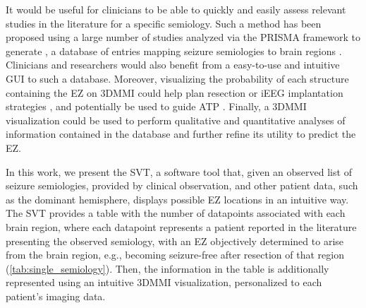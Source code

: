 It would be useful for clinicians to be able to quickly and easily assess relevant studies in the literature for a specific semiology.
Such a method has been proposed using a large number of studies analyzed via the \ac{PRISMA} framework \cite{page_prisma_2021} to generate \svtdatabase, a database of entries mapping seizure semiologies to brain regions \cite{alim-marvasti_probabilistic_2022}.
Clinicians and researchers would also benefit from a easy-to-use and intuitive \ac{GUI} to such a database.
Moreover, visualizing the probability of each structure containing the \ac{EZ} on \ac{3DMMI} could help plan resection or \ac{iEEG} implantation strategies \cite{nowell_utility_2015,nowell_resection_2017}, and potentially be used to guide \ac{ATP} \cite{sparks_automated_2017}.
Finally, a \ac{3DMMI} visualization could be used to perform qualitative and quantitative analyses of information contained in the database and further refine its utility to predict the \ac{EZ}.

In this work, we present the \ac{SVT}, a software tool that, given an observed list of seizure semiologies, provided by clinical observation, and other patient data, such as the dominant hemisphere, displays possible \ac{EZ} locations in an intuitive way.
The \ac{SVT} provides a table with the number of datapoints associated with each brain region, where each datapoint represents a patient reported in the literature presenting the observed semiology, with an \ac{EZ} objectively determined to arise from the brain region, e.g., becoming seizure-free after resection of that region (\cref{tab:single_semiology}).
Then, the information in the table is additionally represented using an intuitive \ac{3DMMI} visualization, personalized to each patient's imaging data.


